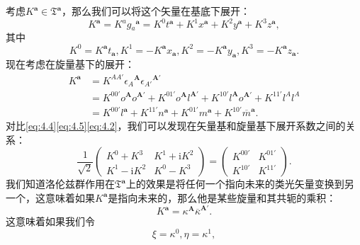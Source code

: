 考虑$K^{\boldsymbol{a}} \in \mathfrak{T}^{\boldsymbol{a}}$，那么我们可以将这个矢量在基底下展开：
\begin{equation}
	K^{\boldsymbol{a}} =K^{a} g{_{a}}^{\boldsymbol{a}} =K^{0} t^{\boldsymbol{a}} +K^{1} x^{\boldsymbol{a}} +K^{2} y^{\boldsymbol{a}} +K^{3} z^{\boldsymbol{a}} ,
	\label{eq:4.4}
\end{equation}
其中
\begin{equation*}
	K^{0} =K^{\boldsymbol{a}} t_{\boldsymbol{a}} ,K^{1} =-K^{\boldsymbol{a}} x_{\boldsymbol{a}} ,K^{2} =-K^{\boldsymbol{a}} y_{\boldsymbol{a}} ,K^{3} =-K^{\boldsymbol{a}} z_{\boldsymbol{a}} .
\end{equation*}
现在考虑在旋量基下的展开：
\begin{equation}
	\begin{aligned}
		K^{\boldsymbol{a}} & =K^{AA'} \epsilon {_{A}}^{\boldsymbol{A}} \epsilon {_{A'}}^{\boldsymbol{A} '}\\
		& =K^{00'} o^{\boldsymbol{A}} o^{\boldsymbol{A} '} +K^{01'} o^{\boldsymbol{A}} l^{\boldsymbol{A} '} +K^{10'} l^{\boldsymbol{A}} o^{\boldsymbol{A} '} +K^{11'} l^{A} l^{A}\\
		& =K^{00'} l^{\boldsymbol{a}} +K^{11'} n^{\boldsymbol{a}} +K^{01'} m^{\boldsymbol{a}} +K^{10'}\overline{m}^{\boldsymbol{a}} .
	\end{aligned}
	\label{eq:4.5}
\end{equation}
对比\ref{eq:4.4}\ref{eq:4.5}\ref{eq:4.2}，我们可以发现在矢量基和旋量基下展开系数之间的关系：
\begin{equation*}
	\frac{1}{\sqrt{2}}\begin{pmatrix}
		K^{0} +K^{3} & K^{1} +\mathrm{i} K^{2}\\
		K^{1} -\mathrm{i} K^{2} & K^{0} -K^{3}
	\end{pmatrix} =\begin{pmatrix}
		K^{00'} & K^{01'}\\
		K^{10'} & K^{11'}
	\end{pmatrix} .
\end{equation*}
我们知道洛伦兹群作用在$\mathfrak{T}^{\boldsymbol{a}}$上的效果是将任何一个指向未来的类光矢量变换到另一个，这意味着如果$K^{\boldsymbol{a}}$是指向未来的，那么他是某些旋量和其共轭的乘积：
\begin{equation*}
	K^{\boldsymbol{a}} =\kappa ^{\boldsymbol{A}}\overline{\kappa }^{\boldsymbol{A} '} .
\end{equation*}
这意味着如果我们令
\begin{equation*}
	\xi =\kappa ^{0} ,\eta =\kappa ^{1} ,
\end{equation*}
